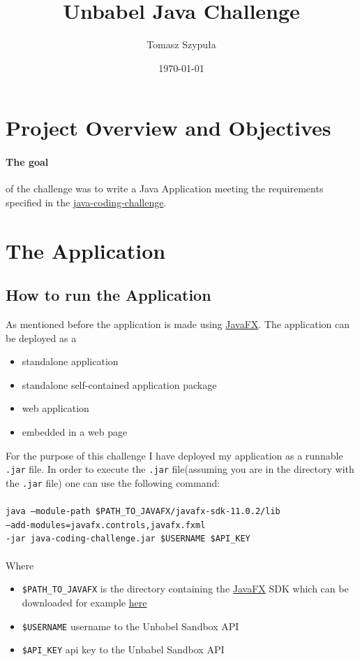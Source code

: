 \documentclass[12pt]{article}
\title{\Huge{Unbabel Java Challenge}}
\author{Tomasz Szypuła}
\date{\today}
\begin{document}
\maketitle
\section{Project Overview and Objectives }
\paragraph{The goal}of the challenge was to write a Java Application meeting the requirements specified in the \href{ https://github.com/Unbabel/java-coding-challenge}{java-coding-challenge}.

 


\section{The Application}
\subsection{How to run the Application}
As mentioned before the application is made using \href{https://openjfx.io/javadoc/11/}{JavaFX}. The application can be deployed as a
\begin{itemize}
\item standalone application
\item standalone self-contained application package
\item web application
\item embedded in a web page
\end{itemize}
For the purpose of this challenge I have deployed my application as a runnable \texttt{.jar} file. In order to execute the \texttt{.jar} file(assuming you are in the directory with the \texttt{.jar} file) one can use the following command: 
\paragraph{}
\texttt{java --module-path \$PATH\_TO\_JAVAFX/javafx-sdk-11.0.2/lib \\--add-modules=javafx.controls,javafx.fxml \\-jar java-coding-challenge.jar \$USERNAME \$API\_KEY}
\paragraph{}
Where 
\begin{itemize}
\item \texttt{\$PATH\_TO\_JAVAFX} is the directory containing the \href{https://openjfx.io/javadoc/11/}{JavaFX} SDK which can be downloaded for example  \href{https://gluonhq.com/products/javafx/}{here}
\item \texttt{\$USERNAME} username to the Unbabel Sandbox API
\item \texttt{\$API\_KEY} api key to the Unbabel Sandbox API
\end{itemize}
\end{document}
